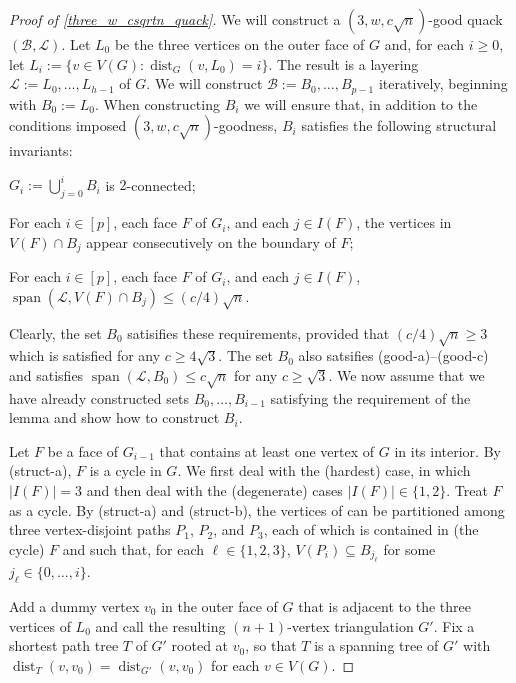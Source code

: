 \documentclass{patmorin}
\DeclareMathOperator{\spn}{span}
\DeclareMathOperator{\dist}{dist}
\begin{document}
\begin{proof}[Proof of \cref{three_w_csqrtn_quack}]
  We will construct a  $(3,w,c\sqrt{n})$-good quack $(\mathcal{B},\mathcal{L})$.
  Let $L_0$ be the three vertices on the outer face of $G$ and, for each $i\ge 0$, let $L_i:=\{v\in V(G):\dist_G(v,L_0)=i\}$. The result is a layering $\mathcal{L}:=L_0,\ldots,L_{h-1}$ of $G$. We will construct $\mathcal{B}:=B_0,\ldots,B_{p-1}$ iteratively, beginning with $B_0:=L_0$.  When constructing $B_i$ we will ensure that, in addition to the conditions imposed $(3,w,c\sqrt{n})$-goodness, $B_i$ satisfies the following structural invariants:
  \begin{compactenum}[({struct}-a)]
    \item $G_i:=\bigcup_{j=0}^i B_i$ is $2$-connected;
    \item For each $i\in[p]$, each face $F$ of $G_i$, and each $j\in I(F)$,  the vertices in $V(F)\cap B_j$ appear consecutively on the boundary of $F$;
    \item For each $i\in[p]$, each face $F$ of $G_i$, and each $j\in I(F)$, $\spn(\mathcal{L},V(F)\cap B_j)\le (c/4)\sqrt{n}$.
  \end{compactenum}

  Clearly, the set $B_0$ satisifies these requirements, provided that $(c/4)\sqrt{n} \ge 3$ which is satisfied for any $c\ge 4\sqrt{3}$.  The set $B_0$ also satsifies (good-a)--(good-c) and satisfies $\spn(\mathcal{L},B_0)\le c\sqrt{n}$ for any $c\ge \sqrt{3}$.  We now assume that we have already constructed sets $B_0,\ldots,B_{i-1}$ satisfying the requirement of the lemma and show how to construct $B_i$.

  Let $F$ be a face of $G_{i-1}$ that contains at least one vertex of $G$ in its interior.  By (struct-a), $F$ is a cycle in $G$.  We first deal with the (hardest) case, in which $|I(F)|=3$ and then deal with the (degenerate) cases $|I(F)|\in\{1,2\}$.  Treat $F$ as a cycle.  By (struct-a) and (struct-b), the vertices of can be partitioned among three vertex-disjoint paths $P_1$, $P_2$, and $P_3$, each of which is contained in (the cycle) $F$ and such that, for each $\ell\in\{1,2,3\}$,  $V(P_i)\subseteq B_{j_\ell}$ for some $j_\ell\in\{0,\ldots,i\}$.

  Add a dummy vertex $v_0$ in the outer face of $G$ that is adjacent to the three vertices of $L_0$ and call the resulting $(n+1)$-vertex triangulation $G'$.
  Fix a shortest path tree $T$ of $G'$ rooted at $v_0$, so that $T$ is a spanning tree of $G'$ with $\dist_T(v,v_0)=\dist_{G'}(v,v_0)$ for each $v\in V(G)$.


\end{proof}
\end{document}

